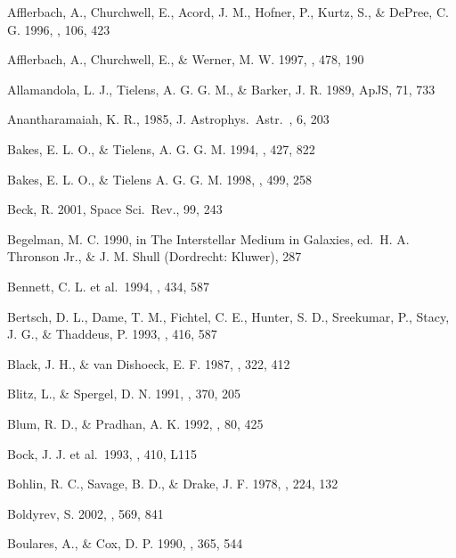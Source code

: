 \documentclass[12pt,preprint,flushrt]{aastex}
\begin{document}
\newpage
\begin{thebibliography}{}

Afflerbach, A., Churchwell, E.,
Acord, J. M., Hofner, P., Kurtz, S., \& DePree, C. G. 1996, \apjs, 106, 423

Afflerbach, A., Churchwell, E.,
\& Werner, M. W. 1997, \apj, 478, 190

Allamandola, L. J.,
Tielens, A. G. G. M., \& Barker, J. R. 1989, ApJS, 71, 733

 Anantharamaiah, K. R., 1985,
J. Astrophys.\ Astr.\ , 6, 203

Bakes, E. L. O., \& Tielens, A. G. G. M. 1994, \apj, 427, 822

Bakes, E. L. O., \& Tielens 
A. G. G. M. 1998, \apj, 499, 258

Beck, R. 2001, Space Sci.\ Rev., 99, 243

Begelman, M. C. 1990, in The Interstellar
Medium in Galaxies, ed.\ H. A. Thronson Jr., \& J. M. Shull
(Dordrecht: Kluwer), 287

Bennett, C. L. et al.\ 1994, 
\apj, 434, 587

Bertsch, D. L., Dame, T. M., Fichtel,
C. E., Hunter, S. D., Sreekumar, P., Stacy, J. G., \& Thaddeus, P.
1993, \apj, 416, 587

Black, J. H., 
\& van Dishoeck, E. F. 1987, \apj, 322, 412 

Blitz, L., \& Spergel, D. N.
1991, \apj, 370, 205

Blum, R. D., \& Pradhan, A. K. 1992,
\apjs, 80, 425

Bock, J. J. et al.\ 1993, \apj, 
410, L115

Bohlin, R. C., Savage,
B. D., \& Drake, J. F. 1978, \apj, 224, 132

Boldyrev, S. 2002, \apj, 569, 841

Boulares, A., \& Cox, D. P. 1990, \apj, 365, 544


\end{thebibliography}
\end{document}
